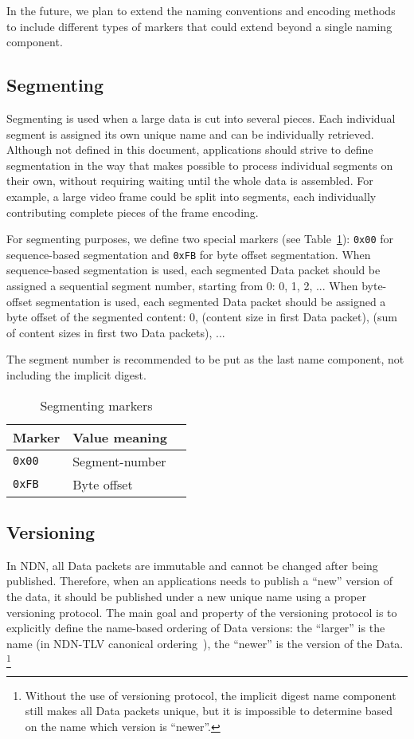 In the future, we plan to extend the naming conventions and encoding methods to include different types of markers that could extend beyond a single naming component.

\subsection{Segmenting}
\label{sec:segmenting}

Segmenting is used when a large data is cut into several pieces.
Each individual segment is assigned its own unique name and can be individually retrieved.
Although not defined in this document, applications should strive to define segmentation in the way that makes possible to process individual segments on their own, without requiring waiting until the whole data is assembled.
For example, a large video frame could be split into segments, each individually contributing complete pieces of the frame encoding.

For segmenting purposes, we define two special markers (see Table~\ref{tab:segmenting}): \verb|0x00| for sequence-based segmentation and \verb|0xFB| for byte offset segmentation.
When sequence-based segmentation is used, each segmented Data packet should be assigned a sequential segment number, starting from 0: 0, 1, 2, ...
When byte-offset segmentation is used, each segmented Data packet should be assigned a byte offset of the segmented content: 0, (content size in first Data packet), (sum of content sizes in first two Data packets), ...

The segment number is recommended to be put as the last name component, not including the implicit digest.

\begin{table}[h!]
  \centering
  \caption{Segmenting markers}
  \label{tab:segmenting}
  \begin{tabular}{|l|l|l|}
    \hline
    Marker & Value meaning \\
    \hline \hline
    \verb|0x00| & Segment-number \\
    \verb|0xFB| & Byte offset \\
    \hline
  \end{tabular}
\end{table}

\subsection{Versioning}
\label{sec:version}

In NDN, all Data packets are immutable and cannot be changed after being published.
Therefore, when an applications needs to publish a ``new'' version of the data, it should be published under a new unique name using a proper versioning protocol.
The main goal and property of the versioning protocol is to explicitly define the name-based ordering of Data versions: the ``larger'' is the name (in NDN-TLV canonical ordering~\cite{ndn-tlv}), the ``newer'' is the version of the Data.%
\footnote{Without the use of versioning protocol, the implicit digest name component still makes all Data packets unique, but it is impossible to determine based on the name which version is ``newer''.}

